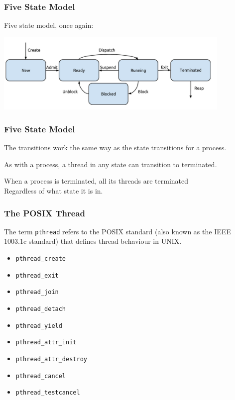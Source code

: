 \begin{frame}
	\frametitle{Five State Model}
	Five state model, once again:

	\begin{center}
		\includegraphics[width=0.85\textwidth]{images/5-state-model.png}
	\end{center}

\end{frame}

\begin{frame}
	\frametitle{Five State Model}

	The transitions work the same way as the state transitions for a process.

	As with a process, a thread in any state can transition to terminated.

	When a process is terminated, all its threads are terminated\\
	\quad Regardless of what state it is in.


\end{frame}


\begin{frame}
	\frametitle{The POSIX Thread}

	The term \texttt{pthread} refers to the POSIX standard (also known as the IEEE 1003.1c standard) that defines thread behaviour in UNIX.

	\begin{itemize}
		\item \texttt{pthread\_create}
		\item \texttt{pthread\_exit}
		\item \texttt{pthread\_join}
		\item \texttt{pthread\_detach}
		\item \texttt{pthread\_yield}
		\item \texttt{pthread\_attr\_init}
		\item \texttt{pthread\_attr\_destroy}
		\item \texttt{pthread\_cancel}
		\item \texttt{pthread\_testcancel}
	\end{itemize}

\end{frame}


